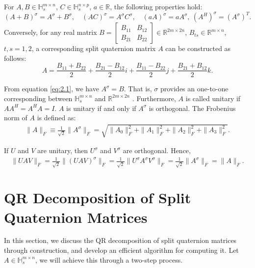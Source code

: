 \documentclass[12pt]{article}
\numberwithin{equation}{section}
\begin{document}
For $A, B \in \mathbb{H}_s^{m \times n}$, $C \in \mathbb{H}_s^{n \times p}$, $a \in \mathbb{R}$, the following properties hold:
\begin{equation}\label{eq:2.2}
    (A + B)^\sigma = A^\sigma + B^\sigma, \quad (AC)^\sigma = A^\sigma C^\sigma, \quad (a A)^\sigma = a A^\sigma, \ (A^H)^\sigma = (A^\sigma)^T.
\end{equation}
Conversely, for any real matrix $B = \begin{bmatrix} B_{11} & B_{12} \\ B_{21} & B_{22} \end{bmatrix} \in \mathbb{R}^{2m \times 2n}$, $B_{ts} \in \mathbb{R}^{m \times n}$, $t, s = 1, 2$, a corresponding split quaternion matrix $A$ can be constructed as follows:
\begin{equation}\label{eq:2.3}
{A} = \frac{B_{11} + B_{22}}{2} + \frac{B_{21} - B_{12}}{2}i + \frac{B_{11} - B_{22}}{2}j + \frac{B_{21} + B_{12}}{2}k.
\end{equation}

From equation \eqref{eq:2.1}, we have ${A}^\sigma = B$. 
That is, $\sigma$ provides an one-to-one corresponding between $\mathbb{H}_s^{m\times n}$ and $\mathbb{R}^{2m \times 2n}$ \citep{Gang2024}. Furthermore, $A$ is called unitary if $AA^H = A^H A = I$. $A$ is unitary if and only if $A^\sigma$ is orthogonal.
 The Frobenius norm of $A$ is defined as: 
 \begin{align*}
     \| A \|_F \equiv \frac{1}{\sqrt{2}} \| A^\sigma \|_F = \sqrt{\| A_0 \|_F^2 + \| A_1 \|_F^2 + \| A_2 \|_F^2 + \| A_3 \|_F^2}.
\end{align*}

If $U$ and $ V$ are unitary, then $U^\sigma$ and $V^\sigma$ are orthogonal.  Hence,
\begin{align*}
\|UAV\|_F = \frac{1}{\sqrt{2}} \|(UAV)^\sigma\|_F 
= \frac{1}{\sqrt{2}} \|U^\sigma A^\sigma V^\sigma\|_F 
= \frac{1}{\sqrt{2}} \|A^\sigma\|_F 
= \|A\|_F.
\end{align*}

\section{QR Decomposition of Split Quaternion Matrices}
In this section, we discuss the QR decomposition of split quaternion matrices through construction, and develop an efficient algorithm for computing it. Let $A \in \mathbb{H}_s^{m \times n}$, we will achieve this through a two-step process.
\end{document}
